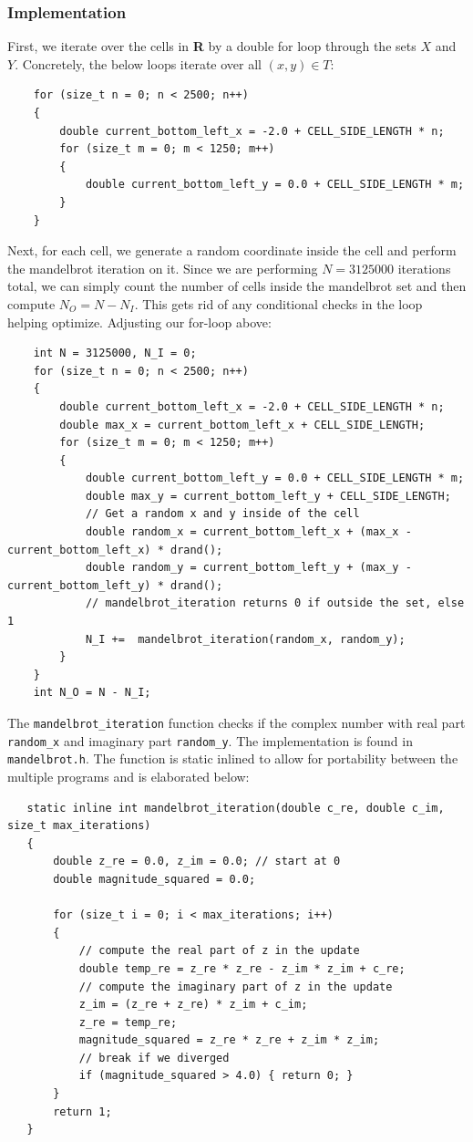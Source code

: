 \documentclass{article}
\begin{document}
\subsubsection{Implementation}
First, we iterate over the cells in \textbf{R} by a double for loop 
through the sets $X$ and $Y$. Concretely, the below loops iterate over all $(x, y) \in T$:
\newpage
\begin{lstlisting}
    for (size_t n = 0; n < 2500; n++)
    {
        double current_bottom_left_x = -2.0 + CELL_SIDE_LENGTH * n;
        for (size_t m = 0; m < 1250; m++)
        {
            double current_bottom_left_y = 0.0 + CELL_SIDE_LENGTH * m;
        }
    }
\end{lstlisting}
Next, for each cell, we generate a random coordinate inside the cell and perform the 
mandelbrot iteration on it. Since we are performing $N = 3125000$ iterations total, we 
can simply count the number of cells inside the mandelbrot set and then compute $N_O = N - N_I$. 
This gets rid of any conditional checks in the loop helping optimize.
Adjusting our for-loop above:
\begin{lstlisting}
    int N = 3125000, N_I = 0;
    for (size_t n = 0; n < 2500; n++)
    {
        double current_bottom_left_x = -2.0 + CELL_SIDE_LENGTH * n;
        double max_x = current_bottom_left_x + CELL_SIDE_LENGTH;
        for (size_t m = 0; m < 1250; m++)
        {
            double current_bottom_left_y = 0.0 + CELL_SIDE_LENGTH * m;
            double max_y = current_bottom_left_y + CELL_SIDE_LENGTH;
            // Get a random x and y inside of the cell
            double random_x = current_bottom_left_x + (max_x - current_bottom_left_x) * drand();
            double random_y = current_bottom_left_y + (max_y - current_bottom_left_y) * drand();
            // mandelbrot_iteration returns 0 if outside the set, else 1
            N_I +=  mandelbrot_iteration(random_x, random_y);
        }
    }
    int N_O = N - N_I; 
\end{lstlisting}
The \texttt{mandelbrot\_iteration} function checks if the complex number with real part 
\texttt{random\_x} and imaginary part \texttt{random\_y}. The implementation is 
found in \texttt{mandelbrot.h}. The function is static inlined to allow for portability 
between the multiple programs and is elaborated below:
\begin{lstlisting}
   static inline int mandelbrot_iteration(double c_re, double c_im, size_t max_iterations)
   {
       double z_re = 0.0, z_im = 0.0; // start at 0
       double magnitude_squared = 0.0;
   
       for (size_t i = 0; i < max_iterations; i++)
       {
           // compute the real part of z in the update
           double temp_re = z_re * z_re - z_im * z_im + c_re; 
           // compute the imaginary part of z in the update
           z_im = (z_re + z_re) * z_im + c_im; 
           z_re = temp_re;
           magnitude_squared = z_re * z_re + z_im * z_im;
           // break if we diverged
           if (magnitude_squared > 4.0) { return 0; }
       }
       return 1;
   } 
\end{lstlisting}
\end{document}
